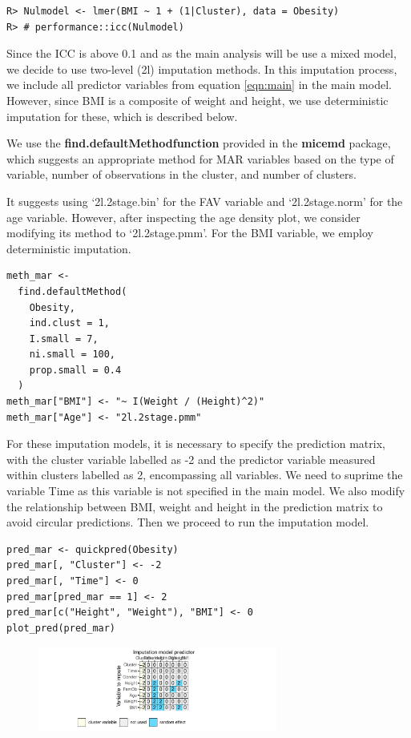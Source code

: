 \documentclass[
  article]{jss}
\begin{document}
\begin{verbatim}
R> Nulmodel <- lmer(BMI ~ 1 + (1|Cluster), data = Obesity)
R> # performance::icc(Nulmodel)
\end{verbatim}

Since the ICC is above 0.1 and as the main analysis will be use a mixed
model, we decide to use two-level (2l) imputation methods. In this
imputation process, we include all predictor variables from equation
\ref{eqn:main} in the main model. However, since BMI is a composite of
weight and height, we use deterministic imputation for these, which is
described below.

We use the \textbf{find.defaultMethodfunction} provided in the
\textbf{micemd} package, which suggests an appropriate method for MAR
variables based on the type of variable, number of observations in the
cluster, and number of clusters.

It suggests using `2l.2stage.bin' for the FAV variable and
`2l.2stage.norm' for the age variable. However, after inspecting the age
density plot, we consider modifying its method to `2l.2stage.pmm'. For
the BMI variable, we employ deterministic imputation.

\begin{verbatim}
meth_mar <-
  find.defaultMethod(
    Obesity,
    ind.clust = 1,
    I.small = 7,
    ni.small = 100,
    prop.small = 0.4
  )
meth_mar["BMI"] <- "~ I(Weight / (Height)^2)"
meth_mar["Age"] <- "2l.2stage.pmm"
\end{verbatim}

For these imputation models, it is necessary to specify the prediction
matrix, with the cluster variable labelled as -2 and the predictor
variable measured within clusters labelled as 2, encompassing all
variables. We need to suprime the variable Time as this variable is not
specified in the main model. We also modify the relationship between
BMI, weight and height in the prediction matrix to avoid circular
predictions. Then we proceed to run the imputation model.

\begin{verbatim}
pred_mar <- quickpred(Obesity)
pred_mar[, "Cluster"] <- -2 
pred_mar[, "Time"] <- 0
pred_mar[pred_mar == 1] <- 2
pred_mar[c("Height", "Weight"), "BMI"] <- 0
plot_pred(pred_mar)
\end{verbatim}

\begin{figure}[h]

{\centering \includegraphics[width=0.7\textwidth,height=\textheight]{manuscript_files/figure-pdf/obesity-predmar-1.pdf}

}

\end{figure}
\end{document}
